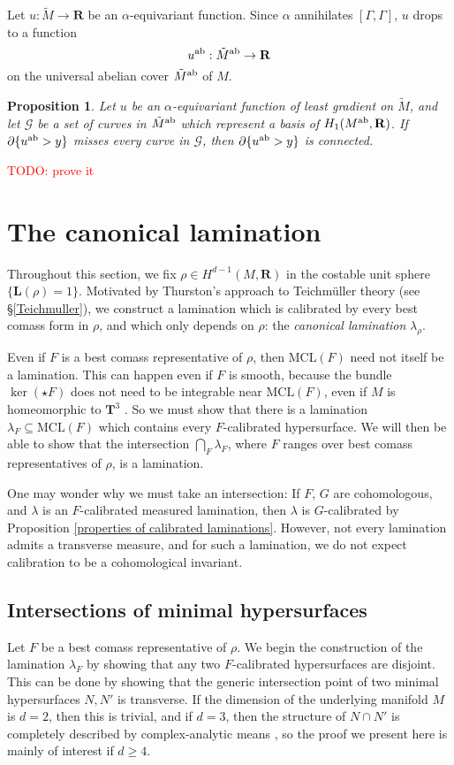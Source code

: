 \documentclass[reqno,11pt]{amsart}
\newcommand{\RR}{\mathbf{R}}
\newcommand{\MCL}{\mathrm{MCL}}
\newcommand{\Comass}{\mathbf L}
\newcommand{\dfn}[1]{\emph{#1}\index{#1}}
\newtheorem{proposition}[theorem]{Proposition}
\theoremstyle{definition}
\numberwithin{equation}{section}
\newcommand\todo[1]{\textcolor{red}{TODO: #1}}
\begin{document}
Let $u: \tilde M \to \RR$ be an $\alpha$-equivariant function.
Since $\alpha$ annihilates $[\Gamma, \Gamma]$, $u$ drops to a function
$$u^{\rm ab}: \tilde M^{\rm ab} \to \RR$$
on the universal abelian cover $\tilde M^{\rm ab}$ of $M$.

\begin{proposition}\label{abelian cover connected}
Let $u$ be an $\alpha$-equivariant function of least gradient on $\tilde M$, and let $\mathscr G$ be a set of curves in $\tilde M^{\rm ab}$ which represent a basis of $H_1(M^{\rm ab}, \RR)$.
If $\partial \{u^{\rm ab} > y\}$ misses every curve in $\mathscr G$, then $\partial \{u^{\rm ab} > y\}$ is connected.
\end{proposition}

\todo{prove it}

\section{The canonical lamination}
\label{canonical sec}
Throughout this section, we fix $\rho \in H^{d - 1}(M, \RR)$ in the costable unit sphere $\{\Comass(\rho) = 1\}$.
Motivated by Thurston's approach to Teichm\"uller theory (see \S\ref{Teichmuller}), we construct a lamination which is calibrated by every best comass form in $\rho$, and which only depends on $\rho$: the \dfn{canonical lamination} $\lambda_\rho$.

Even if $F$ is a best comass representative of $\rho$, then $\MCL(F)$ need not itself be a lamination.
This can happen even if $F$ is smooth, because the bundle $\ker(\star F)$ does not need to be integrable near $\MCL(F)$, even if $M$ is homeomorphic to $\mathbf T^3$ \cite[Example 5.4]{bangert_cui_2017}.
So we must show that there is a lamination $\lambda_F \subseteq \MCL(F)$ which contains every $F$-calibrated hypersurface.
We will then be able to show that the intersection $\bigcap_F \lambda_F$, where $F$ ranges over best comass representatives of $\rho$, is a lamination.

One may wonder why we must take an intersection:
If $F$, $G$ are cohomologous, and $\lambda$ is an $F$-calibrated measured lamination, then $\lambda$ is $G$-calibrated by Proposition \ref{properties of calibrated laminations}.
However, not every lamination admits a transverse measure, and for such a lamination, we do not expect calibration to be a cohomological invariant.


\subsection{Intersections of minimal hypersurfaces}\label{nodal appendix}
Let $F$ be a best comass representative of $\rho$.
We begin the construction of the lamination $\lambda_F$ by showing that any two $F$-calibrated hypersurfaces are disjoint.
This can be done by showing that the generic intersection point of two minimal hypersurfaces $N, N'$ is transverse.
If the dimension of the underlying manifold $M$ is $d = 2$, then this is trivial, and if $d = 3$, then the structure of $N \cap N'$ is completely described by complex-analytic means \cite[Theorem 7.3]{colding2011course}, so the proof we present here is mainly of interest if $d \geq 4$.
\end{document}
